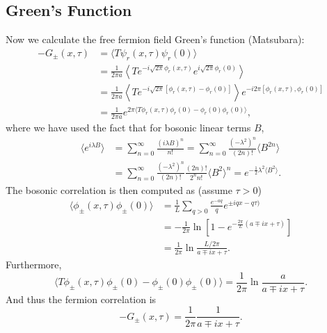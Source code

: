 \documentclass[aps,prb,superscriptaddress,nofootinbib]{revtex4}
\begin{document}
\subsection{Green's Function}
Now we calculate the free fermion field Green's function (Matsubara):
\begin{equation}
\begin{aligned}
	-G_\pm(x,\tau) &= \langle T \psi_r(x,\tau)\psi_r(0)\rangle \\
	&= \frac{1}{2\pi a} \left\langle T e^{-i\sqrt{2\pi}\phi_r(x,\tau)} e^{i\sqrt{2\pi}\phi_r(0)} \right\rangle \\
	&= \frac{1}{2\pi a} \left\langle T e^{-i\sqrt{2\pi}[\phi_r(x,\tau)-\phi_r(0)]}\right\rangle e^{-i2\pi[\phi_r(x,\tau),\phi_r(0)]} \\
	&= \frac{1}{2\pi a} e^{2\pi\langle T \phi_r(x,\tau)\phi_r(0) - \phi_r(0)\phi_r(0)\rangle},
\end{aligned}
\end{equation}
where we have used the fact that for bosonic linear terms $B$,
\begin{equation}
\begin{aligned}
	\langle e^{i\lambda B}\rangle 
	&= \sum_{n=0}^{\infty} \frac{(i\lambda B)^n}{n!}
		= \sum_{n=0}^{\infty} \frac{(-\lambda^2)^n}{(2n)!} \langle B^{2n}\rangle \\
	&= \sum_{n=0}^{\infty} \frac{(-\lambda^2)^n}{(2n)!} \frac{(2n)!}{2^n n!}\langle B^{2}\rangle^n
	= e^{-\frac{1}{2}\lambda^2 \langle B^2\rangle}.
\end{aligned}
\end{equation}
The bosonic correlation is then computed as (assume $\tau>0$)
\begin{equation}
\begin{aligned}
	\langle \phi_\pm(x,\tau) \phi_\pm(0)\rangle 
	&= \frac{1}{L}\sum_{q>0} \frac{e^{-aq}}{q} e^{\pm iqx - q\tau)} \\
	&= -\frac{1}{2\pi} \ln\left[1-e^{-\frac{2\pi}{L}(a \mp ix + \tau)}\right] \\
	&= \frac{1}{2\pi} \ln \frac{L/2\pi}{a \mp ix + \tau}.
\end{aligned}
\end{equation}
Furthermore, 
\begin{equation}
	\langle T\phi_\pm(x,\tau) \phi_\pm(0) - \phi_\pm(0)\phi_\pm(0)\rangle 
	= \frac{1}{2\pi} \ln \frac{a}{a \mp ix + \tau}.
\end{equation}
And thus the fermion correlation is
\begin{equation}
	-G_\pm(x,\tau) = \frac{1}{2\pi} \frac{1}{a \mp i x + \tau}.
\end{equation}
\end{document}
